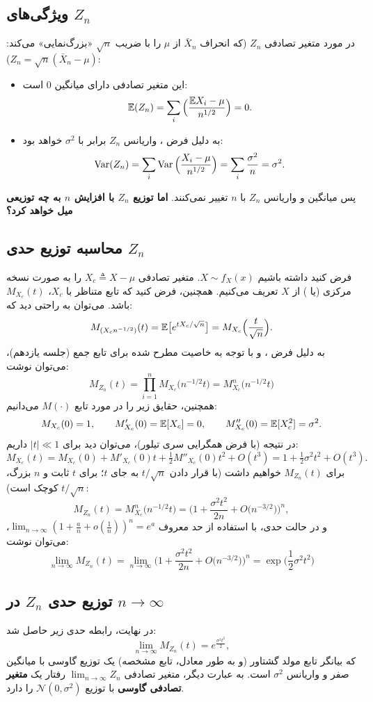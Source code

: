 \subsection{ویژگی‌های $Z_n$}
در مورد متغیر تصادفی $Z_n$ (که انحراف $\bar X_n$ از $\mu$ را با ضریب $\sqrt n$ «بزرگ‌نمایی» می‌کند: $Z_n=\sqrt n(\bar X_n-\mu)$):
\begin{itemize}
\item این متغیر تصادفی دارای میانگین $0$ است:
\[
\mathbb{E}(Z_n)=\sum_i\Big(\frac{\mathbb{E} X_i-\mu}{n^{1/2}}\Big)=0 .
\]
\item به دلیل فرض ، واریانس $Z_n$ برابر با $\sigma^2$ خواهد بود:
\[
\operatorname{Var}(Z_n)=\sum_i\operatorname{Var}\Big(\frac{X_i-\mu}{n^{1/2}}\Big)=\sum_i\frac{\sigma^2}{n}=\sigma^2 .
\]
\end{itemize}
پس میانگین و واریانس $Z_n$ با $n$ تغییر نمی‌کنند. \textbf{اما توزیع $Z_n$ با افزایش $n$ به چه توزیعی میل خواهد کرد؟}

\subsection{محاسبه توزیع حدی $Z_n$}
فرض کنید داشته باشیم $X\sim f_X(x)$. متغیر تصادفی $X_c\triangleq X-\mu$ را به صورت نسخه مرکزی (یا ) از $X$ تعریف می‌کنیم. همچنین، فرض کنید که تابع  متناظر با $X_c$، $M_{X_c}(t)$ باشد. می‌توان به راحتی دید که:
\[
M_{(X_cn^{-1/2})}(t)=\mathbb{E}\big[e^{tX_c/\sqrt n}\big]=M_{X_c}\Big(\frac{t}{\sqrt n}\Big).
\]
به دلیل فرض ، و با توجه به خاصیت مطرح شده برای تابع  جمع (جلسه یازدهم)، می‌توان نوشت:
\[
\boxed{\ M_{Z_n}(t)=\prod_{i=1}^{n}M_{X_c}\big(n^{-1/2}t\big)=M_{X_c}^n\big(n^{-1/2}t\big)\ }
\]
همچنین، حقایق زیر را در مورد تابع $M(\cdot)$ می‌دانیم:
\[
M_{X_c}(0)=1,\qquad M'_{X_c}(0)=\mathbb{E}[X_c]=0,\qquad M''_{X_c}(0)=\mathbb{E}[X_c^2]=\sigma^2 .
\]
در نتیجه (\textcolor{red!70!black}{با فرض همگرایی سری تیلور})، می‌توان دید برای $|t|\ll1$ داریم:
\[
M_{X_c}(t)=M_{X_c}(0)+M'_{X_c}(0)t+\tfrac12M''_{X_c}(0)t^2+O(t^3)=1+\tfrac12\sigma^2t^2+O(t^3).
\]
برای $M_{Z_n}(t)$ خواهیم داشت (با قرار دادن $t/\sqrt n$ به جای $t$؛ برای $t$ ثابت و $n$ بزرگ، $t/\sqrt n$ کوچک است):
\[
M_{Z_n}(t)=M_{X_c}^n\big(n^{-1/2}t\big)=\Big(1+\frac{\sigma^2t^2}{2n}+O\big(n^{-3/2}\big)\Big)^n ,
\]
و در حالت حدی، با استفاده از حد معروف $\lim_{n\to\infty}(1+\frac{a}{n}+o(\frac1n))^n=e^a$، می‌توان نوشت:
\[
\boxed{\ \lim_{n\to\infty}M_{Z_n}(t)=\lim_{n\to\infty}\Big(1+\frac{\sigma^2t^2}{2n}+O\big(n^{-3/2}\big)\Big)^n=\exp\Big(\frac12\sigma^2t^2\Big)\ }
\]

\subsection{توزیع حدی $Z_n$ در $n\to\infty$}
در نهایت، رابطه حدی زیر حاصل شد:
\[
\lim_{n\to\infty}M_{Z_n}(t)=e^{\frac{\sigma^2t^2}{2}},
\]
که بیانگر تابع مولد گشتاور (و به طور معادل، تابع مشخصه) یک توزیع گاوسی با میانگین صفر و واریانس $\sigma^2$ است. به عبارت دیگر، متغیر تصادفی $\lim_{n\to\infty}Z_n$ رفتار یک \textcolor{red!70!black}{\textbf{متغیر تصادفی گاوسی}} با توزیع $\mathcal N(0,\sigma^2)$ را دارد.

